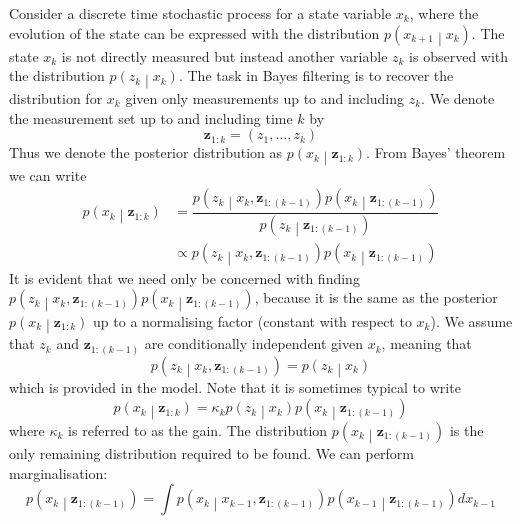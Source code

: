 \documentclass[11pt]{report} %
\begin{document}
Consider a discrete time stochastic process for a state variable $x_{k}$, where the evolution of the state can be expressed with the distribution $p\left(x_{k + 1}\middle|x_{k}\right)$. The state $x_{k}$ is not directly measured but instead another variable $z_{k}$ is observed with the distribution $p\left(z_{k}\middle|x_{k}\right)$. The task in Bayes filtering is to recover the distribution for $x_{k}$ given only measurements up to and including $z_{k}$. We denote the measurement set up to and including time $k$ by
\begin{equation}
\mathbf{z}_{1:k} = \left(z_{1}, \dots, z_{k}\right)
\end{equation}
Thus we denote the posterior distribution as $p\left(x_{k}\middle|\mathbf{z}_{1:k}\right)$. From Bayes' theorem we can write
\begin{align}
p\left(x_{k}\middle|\mathbf{z}_{1:k}\right) &= \dfrac{p\left(z_{k}\middle|x_{k}, \mathbf{z}_{1:\left(k - 1\right)}\right)p\left(x_{k}\middle|\mathbf{z}_{1:\left(k - 1\right)}\right)}{p\left(z_{k}\middle|\mathbf{z}_{1:\left(k - 1\right)}\right)} \\
&\propto p\left(z_{k}\middle|x_{k}, \mathbf{z}_{1:\left(k - 1\right)}\right)p\left(x_{k}\middle|\mathbf{z}_{1:\left(k - 1\right)}\right)
\end{align}
It is evident that we need only be concerned with finding $p\left(z_{k}\middle|x_{k}, \mathbf{z}_{1:\left(k - 1\right)}\right)p\left(x_{k}\middle|\mathbf{z}_{1:\left(k - 1\right)}\right)$, because it is the same as the posterior $p\left(x_{k}\middle|\mathbf{z}_{1:k}\right)$ up to a normalising factor (constant with respect to $x_{k}$). We assume that $z_{k}$ and $\mathbf{z}_{1:\left(k - 1\right)}$ are conditionally independent given $x_{k}$, meaning that
\begin{equation}
p\left(z_{k}\middle|x_{k}, \mathbf{z}_{1:\left(k - 1\right)}\right) = p\left(z_{k}\middle|x_{k}\right)
\end{equation}
which is provided in the model. Note that it is sometimes typical to write
\begin{equation}
p\left(x_{k}\middle|\mathbf{z}_{1:k}\right) = \kappa_{k} p\left(z_{k}\middle|x_{k}\right)p\left(x_{k}\middle|\mathbf{z}_{1:\left(k - 1\right)}\right)
\end{equation}
where $\kappa_{k}$ is referred to as the gain. The distribution $p\left(x_{k}\middle|\mathbf{z}_{1:\left(k - 1\right)}\right)$ is the only remaining distribution required to be found. We can perform marginalisation:
\begin{equation}
p\left(x_{k}\middle|\mathbf{z}_{1:\left(k - 1\right)}\right) = \int p\left(x_{k}\middle|x_{k - 1}, \mathbf{z}_{1:\left(k - 1\right)}\right)p\left(x_{k - 1}\middle|\mathbf{z}_{1:\left(k - 1\right)}\right)dx_{k - 1}
\end{equation}
\end{document}
